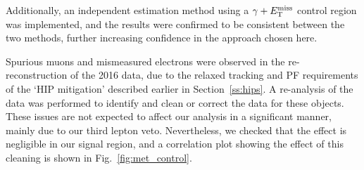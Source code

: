 Additionally, an independent estimation method using a $\gamma+E_\mathrm{T}^{\mathrm{miss}}$ control region was implemented, and the results were 
confirmed to be consistent between the two methods, further increasing confidence in the approach chosen here.

Spurious muons and mismeasured electrons were observed in the re-reconstruction of the 2016 data, due to the relaxed tracking and PF requirements of the `HIP mitigation'
described earlier in Section~\ref{ss:hips}. 
A re-analysis of the data was performed to identify and clean or correct the data for these objects.
These issues are not expected to affect our analysis in a significant manner, mainly due to our third lepton veto.
Nevertheless, we checked that the effect is negligible in our signal region, and a correlation plot showing the effect of this cleaning is shown in Fig.~\ref{fig:met_control}.

